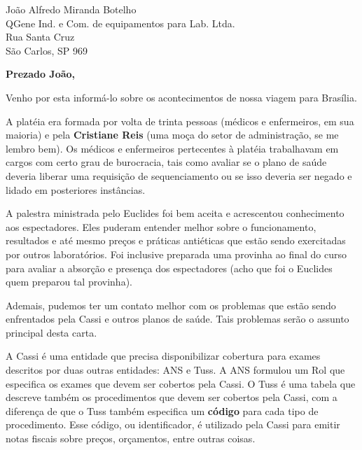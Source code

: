 \documentclass{letter}
\begin{document}

\begin{letter}{João Alfredo Miranda Botelho \\ QGene Ind. e Com. de equipamentos para Lab. Ltda. \\ Rua Santa Cruz \\ São Carlos, SP 969} %


\opening{\textbf{Prezado João,}}

Venho por esta informá-lo sobre os acontecimentos de nossa viagem para Brasília.

A platéia era formada por volta de trinta pessoas (médicos e enfermeiros, em sua maioria) e pela \textbf{Cristiane Reis}
(uma moça do setor de administração, se me lembro bem). Os médicos e enfermeiros pertecentes à platéia trabalhavam
em cargos com certo grau de burocracia, tais como avaliar se o plano de saúde deveria liberar uma requisição
de sequenciamento ou se isso deveria ser negado e lidado em posteriores instâncias.

A palestra ministrada pelo Euclides foi bem aceita e acrescentou conhecimento aos espectadores. Eles puderam entender melhor
sobre o funcionamento, resultados e até mesmo preços e práticas antiéticas que estão sendo exercitadas por outros
laboratórios. Foi inclusive preparada uma provinha ao final do curso para avaliar a absorção e presença dos espectadores (acho que foi
o Euclides quem preparou tal provinha).

Ademais, pudemos ter um contato melhor com os problemas que estão sendo enfrentados pela Cassi e outros planos de saúde.
Tais problemas serão o assunto principal desta carta.

A Cassi é uma entidade que precisa disponibilizar cobertura para exames descritos por duas outras entidades: ANS e Tuss.
A ANS formulou um Rol que especifica os exames que devem ser cobertos pela Cassi. O Tuss é uma tabela que descreve também
os procedimentos que devem ser cobertos pela Cassi, com a diferença de que o Tuss também especifica um \textbf{código} para cada
tipo de procedimento. Esse código, ou identificador, é utilizado pela Cassi para emitir notas fiscais sobre preços, orçamentos,
entre outras coisas.


\end{letter}
\end{document}
